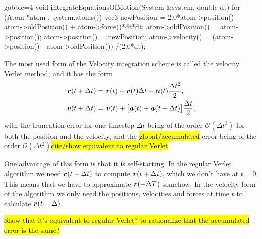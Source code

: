\begin{listing}[!ht]
\begin{cppcode*}{gobble=4}
    void integrateEquationsOfMotion(System &system, double dt)
    {
        for (Atom *atom : system.atoms())
        {
            vec3 newPosition = 2.0*atom->position() - atom->oldPosition() 
                               + atom->force()*dt*dt;
            atom->oldPosition() = atom->position();
            atom->position() = newPosition;
            atom->velocity() = (atom->position() - atom->oldPosition())
                               /(2.0*dt);
        }
    }
\end{cppcode*}
\caption{
    Caption.
    \label{list:regular_verlet}
}
\end{listing}

The most used form of the Velocity integration scheme is called the velocity Verlet method\cite{swope1982computer}, and it has the form
\begin{align}
    \boldsymbol{r}(t + \Delta t) &= \boldsymbol{r}(t) + \boldsymbol{v}(t)\Delta t + \boldsymbol{a}(t)\frac{\Delta t^2}{2}, \label{eq:velocity_verlet_position}\\
    \boldsymbol{v}(t + \Delta t) &= \boldsymbol{v}(t) + \big[\boldsymbol{a}(t) + \boldsymbol{a}(t + \Delta t)\big] \frac{\Delta t}{2}, \label{eq:velocity_verlet_velocity}
\end{align}
with the truncation error for one timestep $\Delta t$ being of the order $\mathcal{O}(\Delta t^3)$ for both the position and the velocity, and the \hl{global/accumulated} error being of the order $\mathcal{O}(\Delta t^2)$\hl{cite/show equivalent to regular Verlet}. 

One advantage of this form is that it is self-starting. In the regular Verlet algorithm we need $\boldsymbol{r}(t-\Delta t)$ to compute $\boldsymbol{r}(t+\Delta t)$, which we don't have at $t = 0$. This means that we have to approximate $\boldsymbol{r}(-\Delta T)$ somehow. In the velocity form of the algorithm we only need the positions, velocities and forces at time $t$ to calculate $\boldsymbol{r}(t+\Delta)$.

\hl{Show that it's equivalent to regular Verlet? to rationalize that the accumulated error is the same?}

